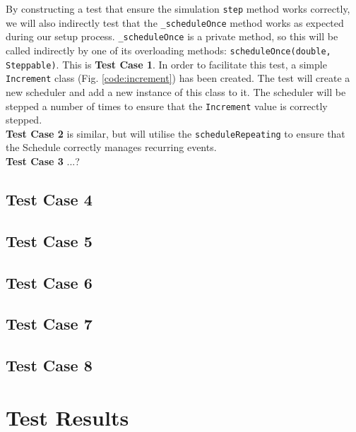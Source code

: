 \documentclass[11pt]{article}
\begin{document}
By constructing a test that ensure the simulation \texttt{step} method works correctly, we will also indirectly test that the \texttt{\_scheduleOnce} method works as expected during our setup process.
\texttt{\_scheduleOnce} is a private method, so this will be called indirectly by one of its overloading methods: \texttt{scheduleOnce(double, Steppable)}.
This is \textbf{Test Case 1}.
In order to facilitate this test, a simple \texttt{Increment} class (Fig. \ref{code:increment}) has been created.
The test will create a new scheduler and add a new instance of this class to it.
The scheduler will be stepped a number of times to ensure that the \texttt{Increment} value is correctly stepped.
\\

\textbf{Test Case 2} is similar, but will utilise the \texttt{scheduleRepeating} to ensure that the Schedule correctly manages recurring events.
\\

\textbf{Test Case 3} ...?
\\

\subsection{Test Case 4}
\subsection{Test Case 5}
\subsection{Test Case 6}
\subsection{Test Case 7}
\subsection{Test Case 8}

\section{Test Results}%
\end{document}
